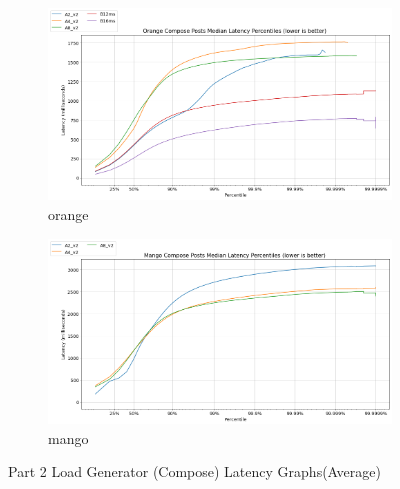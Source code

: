 \begin{figure}[H]
     \centering
     \begin{subfigure}[b]{0.49\textwidth}
         \centering
         \includegraphics[width=\textwidth]{images/orange_compose.png}
         \caption{orange} 
         \label{fig:orange_compose}
     \end{subfigure}
     \hfill
     \begin{subfigure}[b]{0.49\textwidth}
         \centering
         \includegraphics[width=\textwidth]{images/mango_compose.png}
         \caption{mango}
         \label{fig:mango_compose}
     \end{subfigure}
    
        \caption{Part 2 Load Generator (Compose) Latency Graphs(Average)}
        \label{fig:part_2_compose}
\end{figure}
